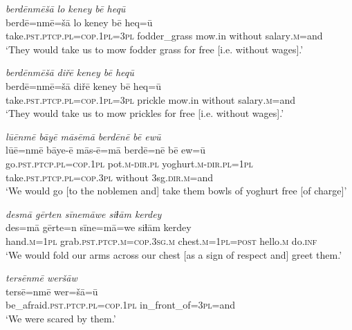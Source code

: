 \ea \label{RE.65}
\textit{berdēnmēšā lo keney bē heqū} \\ 
\gll berdē=nmē=šā lo keney bē heq=ū \\ 
 take\textsc{.pst}\textsc{.ptcp}\textsc{.pl}\textsc{=cop}\textsc{.\textsc{1pl}}\textsc{=3pl} fodder\_grass mow.in without salary\textsc{.m}=and \\ 
\glt `They would take us to mow fodder grass for free [i.e. without wages].'
\z 
 
\ea \label{RE.66}
\textit{berdēnmēšā diřē keney bē heqū} \\ 
\gll berdē=nmē=šā diřē keney bē heq=ū \\ 
 take\textsc{.pst}\textsc{.ptcp}\textsc{.pl}\textsc{=cop}\textsc{.\textsc{1pl}}\textsc{=3pl} prickle mow.in without salary\textsc{.m}=and \\ 
\glt `They would take us to mow prickles for free [i.e. without wages].'
\z 
 
\ea \label{RE.67}
\textit{lūēnmē bāyē māsēmā berdēnē bē ewū} \\ 
\gll lūē=nmē bāye-ē mās-ē=mā berdē=nē bē ew=ū \\ 
 go\textsc{.pst}\textsc{.ptcp}\textsc{.pl}\textsc{=cop}\textsc{.\textsc{1pl}} pot\textsc{.m}\textsc{-dir}\textsc{.pl} yoghurt\textsc{.m}\textsc{-dir}\textsc{.pl}\textsc{=\textsc{1pl}} take\textsc{.pst}\textsc{.ptcp}\textsc{.pl}\textsc{=cop}\textsc{.3pl} without 3sg\textsc{.dir}\textsc{.m}=and \\ 
\glt `We would go [to the noblemen and] take them bowls of yoghurt free [of charge]'
\z 
 
\ea \label{RE.68}
\textit{desmā gērten sīnemāwe siɫām kerdey} \\ 
\gll des=mā gērte=n sīne=mā=we siɫām kerdey \\ 
 hand\textsc{.m}\textsc{=\textsc{1pl}} grab\textsc{.pst}\textsc{.ptcp}\textsc{.m}\textsc{=cop}\textsc{.3sg}\textsc{.m} chest\textsc{.m}\textsc{=\textsc{1pl}}\textsc{=\textsc{post}} hello\textsc{.m} do\textsc{.inf} \\ 
\glt `We would fold our arms across our chest [as a sign of respect and] greet them.'
\z 
 
\ea \label{RE.69}
\textit{tersēnmē weršāw} \\ 
\gll tersē=nmē wer=šā=ū \\ 
 be\_afraid\textsc{.pst}\textsc{.ptcp}\textsc{.pl}\textsc{=cop}\textsc{.\textsc{1pl}} in\_front\_of\textsc{=3pl}=and \\ 
\glt `We were scared by them.'
\z 
 
